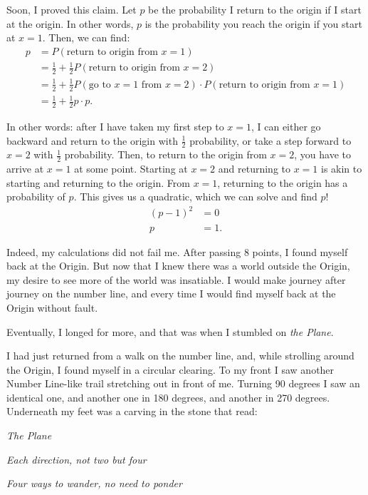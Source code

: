 \documentclass{article}
\begin{document}
Soon, I proved this claim. Let $p$ be the probability I return to the origin if I start at the origin. In other words, $p$ is the probability you reach the origin if you start at $x=1$. Then, we can find:
\begin{align*}
    p &= P\left(\text{return to origin from $x=1$}\right)\\ 
    &= \frac{1}{2} + \frac{1}{2}P\left(\text{return to origin from $x=2$}\right)\\
    &=\frac{1}{2} + \frac{1}{2}P\left(\text{go to $x=1$ from $x=2$}\right) \cdot P\left(\text{return to origin from $x=1$}\right)\\
    &=\frac{1}{2} + \frac{1}{2}p\cdot p.
\end{align*}

In other words: after I have taken my first step to $x=1$, I can either go backward and return to the origin with $\frac{1}{2}$ probability, or take a step forward to $x=2$ with $\frac{1}{2}$ probability. Then, to return to the origin from $x=2$, you have to arrive at $x=1$ at some point. Starting at $x=2$ and returning to $x=1$ is akin to starting and returning to the origin. From $x=1$, returning to the origin has a probability of $p$. This gives us a quadratic, which we can solve and find $p$!
\begin{align*}
    (p-1)^2&=0 \\
    p&=1.
\end{align*}

Indeed, my calculations did not fail me. After passing $8$ points, I found myself back at the Origin. But now that I knew there was a world outside the Origin, my desire to see more of the world was insatiable. I would make journey after journey on the number line, and every time I would find myself back at the Origin without fault.

Eventually, I longed for more, and that was when I stumbled on \emph{the Plane}. 

I had just returned from a walk on the number line, and, while strolling around the Origin, I found myself in a circular clearing. To my front I saw another Number Line-like trail stretching out in front of me. Turning 90 degrees I saw an identical one, and another one in 180 degrees, and another in 270 degrees. Underneath my feet was a carving in the stone that read: 

\emph{The Plane}

\emph{
Each direction, not two but four}

\emph{Four ways to wander, no need to ponder
} 
\end{document}
